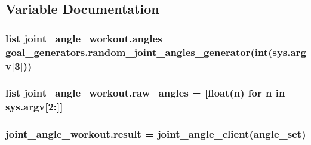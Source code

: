 \subsection{Variable Documentation}
\subsubsection[{\texorpdfstring{angles}{angles}}]{\setlength{\rightskip}{0pt plus 5cm}list joint\+\_\+angle\+\_\+workout.\+angles = {\bf goal\+\_\+generators.\+random\+\_\+joint\+\_\+angles\+\_\+generator}(int(sys.\+argv\mbox{[}3\mbox{]}))}\hypertarget{namespacejoint__angle__workout_a44cb6da34666d45961b26233ed5264bf}{}\label{namespacejoint__angle__workout_a44cb6da34666d45961b26233ed5264bf}
\subsubsection[{\texorpdfstring{raw\+\_\+angles}{raw_angles}}]{\setlength{\rightskip}{0pt plus 5cm}list joint\+\_\+angle\+\_\+workout.\+raw\+\_\+angles = \mbox{[}float(n) for n in sys.\+argv\mbox{[}2\+:\mbox{]}\mbox{]}}\hypertarget{namespacejoint__angle__workout_a2c310c9dff3a6e145dc3474b7c751546}{}\label{namespacejoint__angle__workout_a2c310c9dff3a6e145dc3474b7c751546}
\subsubsection[{\texorpdfstring{result}{result}}]{\setlength{\rightskip}{0pt plus 5cm}joint\+\_\+angle\+\_\+workout.\+result = {\bf joint\+\_\+angle\+\_\+client}(angle\+\_\+set)}\hypertarget{namespacejoint__angle__workout_ad8129235290985797e7512a9f73bdaf4}{}\label{namespacejoint__angle__workout_ad8129235290985797e7512a9f73bdaf4}
